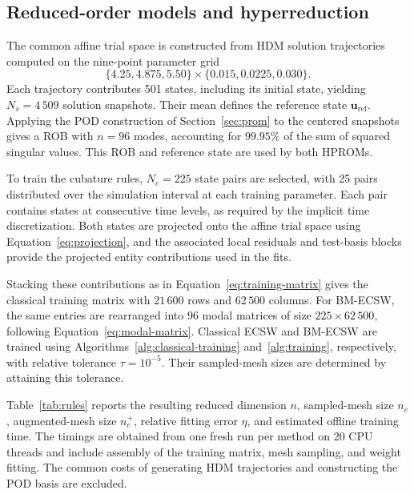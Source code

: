 \documentclass[a4paper,12pt]{article}
\newcommand{\vect}[1]{\boldsymbol{#1}}
\begin{document}
\subsection{Reduced-order models and hyperreduction}

The common affine trial space is constructed from HDM solution trajectories computed on the nine-point parameter grid
\begin{equation}
 \{4.25,4.875,5.50\}\times\{0.015,0.0225,0.030\}.
\end{equation}
Each trajectory contributes 501 states, including its initial state, yielding $N_s=4\,509$ solution snapshots. Their mean defines the reference state $\vect{u}_{\mathrm{ref}}$. Applying the POD construction of Section~\ref{sec:prom} to the centered snapshots gives a ROB with $n=96$ modes, accounting for $99.95\%$ of the sum of squared singular values. This ROB and reference state are used by both HPROMs.

To train the cubature rules, $N_c=225$ state pairs are selected, with 25 pairs distributed over the simulation interval at each training parameter. Each pair contains states at consecutive time levels, as required by the implicit time discretization. Both states are projected onto the affine trial space using Equation~\eqref{eq:projection}, and the associated local residuals and test-basis blocks provide the projected entity contributions used in the fits.

Stacking these contributions as in Equation~\eqref{eq:training-matrix} gives the classical training matrix with $21\,600$ rows and $62\,500$ columns. For BM-ECSW, the same entries are rearranged into 96 modal matrices of size $225\times62\,500$, following Equation~\eqref{eq:modal-matrix}. Classical ECSW and BM-ECSW are trained using Algorithms~\ref{alg:classical-training} and~\ref{alg:training}, respectively, with relative tolerance $\tau=10^{-5}$. Their sampled-mesh sizes are determined by attaining this tolerance.

Table~\ref{tab:rules} reports the resulting reduced dimension $n$, sampled-mesh size $n_e$, augmented-mesh size $n_e^+$, relative fitting error $\eta$, and estimated offline training time. The timings are obtained from one fresh run per method on 20 CPU threads and include assembly of the training matrix, mesh sampling, and weight fitting. The common costs of generating HDM trajectories and constructing the POD basis are excluded.

\begin{table}[H]
 \centering\small
 \caption{Reduced-mesh sizes, relative fitting errors, and estimated offline training times for the 2D parametric inviscid Burgers problem.}
 \label{tab:rules}
 
\end{table}
\end{document}

